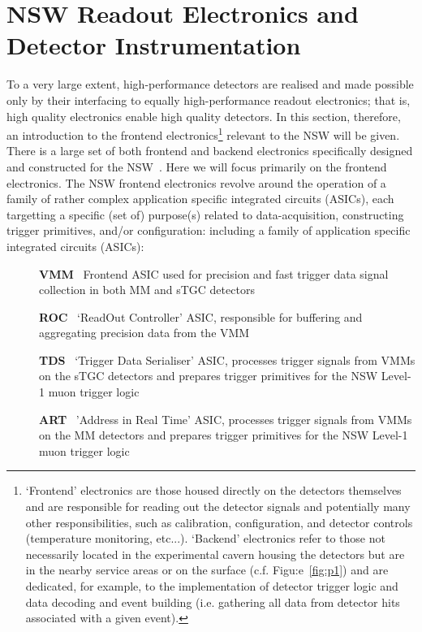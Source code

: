 \section{NSW Readout Electronics and Detector Instrumentation}
\label{sec:nsw_elx}

To a very large extent, high-performance detectors are realised and made
possible only by their interfacing to equally high-performance readout electronics;
that is, high quality electronics enable high quality detectors.
{\color{red}{See Appendix XXX for a discussion on the general characteristics of
detector readout electronics.}}
In this section, therefore, an introduction to the frontend electronics\footnote{`Frontend' electronics
are those housed directly on the detectors themselves and are responsible for reading out the
detector signals and potentially many other responsibilities, such as calibration, configuration, and
detector controls (temperature monitoring, etc...). `Backend' electronics refer to those
not necessarily located in the experimental cavern housing the detectors but are in the nearby
service areas or on the surface (c.f. Figu:e~\ref{fig:p1}) and are dedicated, for example, to the implementation of detector trigger logic
and data decoding and event building (i.e. gathering all data from detector hits associated with a given event).}
relevant to the NSW will be given.
There is a large set of both frontend and backend electronics specifically
designed and constructed for the NSW~\cite{NSWFrontEndChristos}.
Here we will focus primarily on the frontend electronics.
The NSW frontend electronics revolve around the operation of a family
of rather complex application specific integrated circuits (ASICs),
each targetting a specific (set of) purpose(s) related to data-acquisition,
constructing trigger primitives, and/or configuration:
including a family of application specific integrated circuits (ASICs):

\begin{description}
    \item[] \textbf{VMM}~\cite{VMM1GDG,VMMASIC,VMM3George} Frontend ASIC used for precision and fast trigger data signal collection in both MM and sTGC detectors
    \item[] \textbf{ROC}~\cite{NSWTDR,NSWFrontEndChristos} `ReadOut Controller' ASIC, responsible for buffering and aggregating precision data from the VMM
    \item[] \textbf{TDS}~\cite{TDS} `Trigger Data Serialiser' ASIC, processes trigger signals from VMMs on the sTGC detectors and prepares trigger primitives for the NSW Level-1 muon trigger logic
    \item[] \textbf{ART}~\cite{NSWTDR,ARTASIC} 'Address in Real Time' ASIC, processes trigger signals from VMMs on the MM detectors and prepares trigger primitives for the NSW Level-1 muon trigger logic
\end{description}

